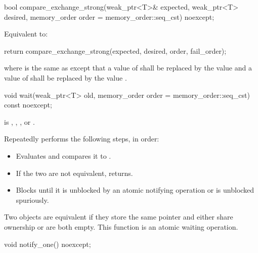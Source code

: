 %
\begin{itemdecl}
bool compare_exchange_strong(weak_ptr<T>& expected, weak_ptr<T> desired,
                             memory_order order = memory_order::seq_cst) noexcept;
\end{itemdecl}

\begin{itemdescr}
\pnum
\effects
Equivalent to:
\begin{codeblock}
return compare_exchange_strong(expected, desired, order, fail_order);
\end{codeblock}
where  is the same as 
except that a value of 
shall be replaced by the value  and
a value of 
shall be replaced by the value .
\end{itemdescr}

%
\begin{itemdecl}
void wait(weak_ptr<T> old, memory_order order = memory_order::seq_cst) const noexcept;
\end{itemdecl}

\begin{itemdescr}
\pnum
\expects
{} is
,
,
, or
.

\pnum
\effects
Repeatedly performs the following steps, in order:
\begin{itemize}
\item
  Evaluates  and compares it to .
\item
  If the two are not equivalent, returns.
\item
  Blocks until it
  is unblocked by an atomic notifying operation or is unblocked spuriously.
\end{itemize}

\pnum
\remarks
Two  objects are equivalent
if they store the same pointer and either share ownership or are both empty.
This function is an atomic waiting operation.
\end{itemdescr}


%
\begin{itemdecl}
void notify_one() noexcept;
\end{itemdecl}

